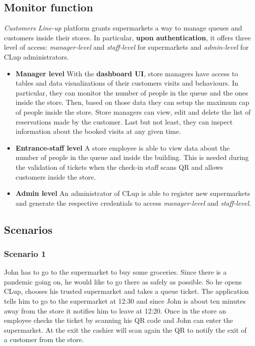 \subsection{Monitor function}
\textit{Customers Line-up} platform grants supermarkets a way to manage queues and customers inside their stores. In particular, \textbf{upon authentication}, it offers three level of access: \textit{manager-level} and \textit{staff-level} for supermarkets and \textit{admin-level} for CLup administrators.

\begin{itemize}
	\item \textbf{Manager level}\newline
	With the \textbf{dashboard UI}, store managers have access to tables and data visualizations of their customers visits and behaviours. In particular, they can monitor the number of people in the queue and the ones inside the store. Then, based on those data they can setup the maximum cap of people inside the store.\newline
	Store managers can view, edit and delete the list of reservations made by the customer.\newline
	Last but not least, they can inspect information about the booked visits at any given time.

	\item \textbf{Entrance-staff level}\newline
	A store employee is able to view data about the number of people in the queue and inside the building. This is needed during the validation of tickets when the check-in staff scans QR and allows customers inside the store.

    \item \textbf{Admin level}\newline
    An administrator of CLup is able to register new supermarkets and generate the respective credentials to access \textit{manager-level} and \textit{staff-level}.
\end{itemize}

	\clearpage


\subsection{Scenarios}

\subsubsection{Scenario 1}\label{sc:first}
John has to go to the supermarket to buy some groceries. Since there is a pandemic going on, he would like to go there as safely as possible.\newline
So he opens CLup, chooses his trusted supermarket and takes a queue ticket. The application tells him to go to the supermarket at 12:30 and since John is about ten minutes away from the store it notifies him to leave at 12:20. Once in the store an employee checks the ticket by scanning his QR code and John can enter the supermarket.
At the exit the cashier will scan again the QR to notify the exit of a customer from the store.

